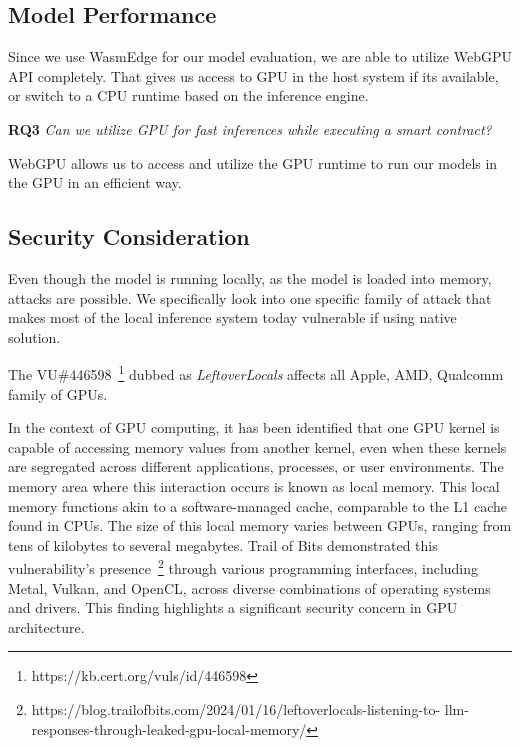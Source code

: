\subsection{Model Performance}

Since we use WasmEdge for our model evaluation, we are able to utilize WebGPU API completely. That gives us access to GPU in the host system if its available, or switch to a CPU runtime based on the inference engine. 

\begin{tcolorbox}
\textbf{RQ3} \textit{Can we utilize GPU for fast inferences while executing a smart contract?}

WebGPU allows us to access and utilize the GPU runtime to run our models in the GPU in an efficient way.
\end{tcolorbox}

\subsection{Security Consideration}

Even though the model is running locally, as the model is loaded into memory, attacks are possible. We specifically look into one specific family of attack that makes most of the local inference system today vulnerable if using native solution.

The VU\#446598~\footnote{https://kb.cert.org/vuls/id/446598} dubbed as \textit{LeftoverLocals} affects all Apple, AMD, Qualcomm family of GPUs. 


In the context of GPU computing, it has been identified that one GPU kernel is capable of accessing memory values from another kernel, even when these kernels are segregated across different applications, processes, or user environments. The memory area where this interaction occurs is known as local memory. This local memory functions akin to a software-managed cache, comparable to the L1 cache found in CPUs. The size of this local memory varies between GPUs, ranging from tens of kilobytes to several megabytes. Trail of Bits demonstrated this vulnerability's presence~\footnote{https://blog.trailofbits.com/2024/01/16/leftoverlocals-listening-to-
llm-responses-through-leaked-gpu-local-memory/} through various programming interfaces, including Metal, Vulkan, and OpenCL, across diverse combinations of operating systems and drivers. This finding highlights a significant security concern in GPU architecture.

